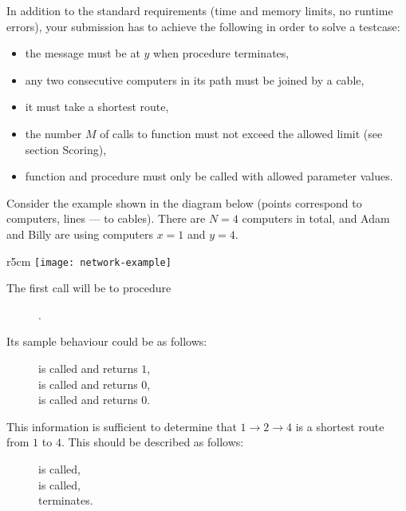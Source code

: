 \documentclass{boi2014}
\begin{document}
    In addition to the standard requirements (time and memory
    limits, no runtime errors), your submission has to achieve the following
    in order to solve a testcase:

    \begin{itemize}
        \item the message must be at $y$ when procedure 
            terminates,
        \item any two consecutive computers in its path must be joined
            by a cable,
        \item it must take a shortest route,
        \item the number $M$ of calls to function  must not
            exceed the allowed limit (see section Scoring),
        \item function  and procedure  must
            only be called with allowed parameter values.
    \end{itemize}

    \Example
    Consider the example shown in the diagram below (points correspond to
    computers, lines --- to cables). There are $N = 4$ computers in total,
    and Adam and Billy are using computers $x = 1$ and $y = 4$.

    \begin{wrapfigure}[1]{r}{5cm}
        \texttt{[image: network-example]}
    \end{wrapfigure}

    The first call will be to procedure
    \begin{figure}[H]
        \centering
        .
    \end{figure}

    Its sample behaviour could be as follows:

    \begin{figure}[H]
        \centering
         is called and returns $1$, \\
         is called and returns $0$, \\
         is called and returns $0$.
    \end{figure}

    This information is sufficient to determine that $1 \to 2 \to 4$ is a
    shortest route from $1$ to $4$. This should be described as follows:

    \begin{figure}[H]
        \centering
         is called, \\
         is called, \\
         terminates.
    \end{figure}
\end{document}
